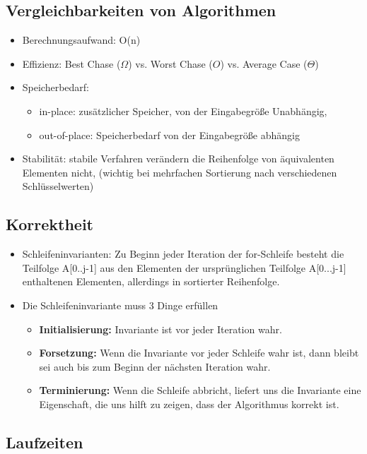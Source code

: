 \documentclass[jou,apacite]{apa6}
\begin{document}
\subsection{Vergleichbarkeiten von Algorithmen}
\begin{itemize}
    \item Berechnungsaufwand: O(n)
    \item Effizienz: Best Chase ($\Omega$) vs. Worst Chase ($O$) vs. Average Case ($\Theta$)
    \item Speicherbedarf: \begin{itemize}
        \item in-place: zusätzlicher Speicher, von der Eingabegröße Unabhängig,
        \item out-of-place: Speicherbedarf von der Eingabegröße abhängig
    \end{itemize}
    \item Stabilität: stabile Verfahren verändern die Reihenfolge von äquivalenten Elementen nicht, (wichtig bei mehrfachen Sortierung nach verschiedenen Schlüsselwerten)
\end{itemize}

\subsection{Korrektheit}
\begin{itemize}
    \item Schleifeninvarianten: Zu Beginn jeder Iteration der for-Schleife besteht die Teilfolge A[0..j-1] aus den Elementen der ursprünglichen Teilfolge A[0...j-1] enthaltenen Elementen, allerdings in sortierter Reihenfolge.
    \item Die Schleifeninvariante muss 3 Dinge erfüllen
    \begin{itemize}
        \item {\bfseries Initialisierung:} Invariante ist vor jeder Iteration wahr.
        \item {\bfseries Forsetzung:} Wenn die Invariante vor jeder Schleife wahr ist, dann bleibt sei auch bis zum Beginn der nächsten Iteration wahr.
        \item {\bfseries Terminierung:} Wenn die Schleife abbricht, liefert uns die Invariante eine Eigenschaft, die uns hilft zu zeigen, dass der Algorithmus korrekt ist. 
    \end{itemize}
\end{itemize}

\subsection{Laufzeiten}
\end{document}
